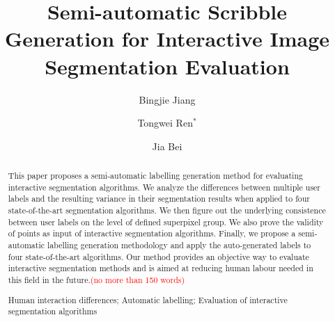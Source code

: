 \documentclass[runningheads,a4paper]{llncs}
\newcommand{\keywords}[1]{\par\addvspace\baselineskip
\noindent\keywordname\enspace\ignorespaces#1}
\begin{document}
\mainmatter  %

\title{Semi-automatic Scribble Generation for Interactive Image Segmentation Evaluation}


%
%
\author{Bingjie Jiang \and Tongwei Ren$^{*}$ \and Jia Bei}
%


\maketitle


\begin{abstract}
This paper proposes a semi-automatic labelling generation method for evaluating interactive segmentation algorithms. We analyze the differences between multiple user labels and the resulting variance in their segmentation results when applied to four state-of-the-art segmentation algorithms. We then figure out the underlying consistence between user labels on the level of defined superpixel group. We also prove the validity of points as input of interactive segmentation algorithms. Finally, we propose a semi-automatic labelling generation methodology and apply the auto-generated labels to four state-of-the-art algorithms. Our method provides an objective way to evaluate interactive segmentation methods and is aimed at reducing human labour needed in this field in the future.\textcolor{red}{(no more than 150 words)}


\keywords{Human interaction differences; Automatic labelling; Evaluation of interactive segmentation algorithms}
\end{abstract}
\end{document}

